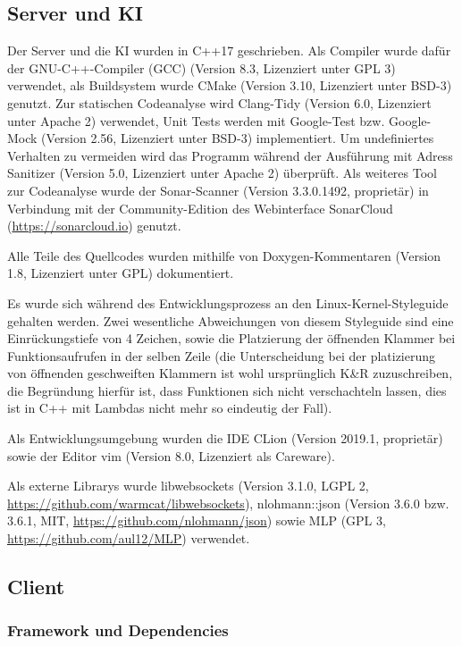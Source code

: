 \subsection{Server und KI}
Der Server und die KI wurden in C++17 geschrieben.
Als Compiler wurde dafür der GNU-C++-Compiler (GCC) (Version 8.3, Lizenziert unter GPL 3) verwendet,
als Buildsystem wurde CMake (Version 3.10, Lizenziert unter BSD-3) genutzt.
Zur statischen Codeanalyse wird Clang-Tidy (Version 6.0, Lizenziert unter Apache 2) verwendet,
Unit Tests werden mit Google-Test bzw. Google-Mock (Version 2.56, Lizenziert unter BSD-3) implementiert.
Um undefiniertes Verhalten zu vermeiden wird das Programm während der Ausführung mit Adress Sanitizer (Version 5.0, Lizenziert unter Apache 2) überprüft.
Als weiteres Tool zur Codeanalyse wurde der Sonar-Scanner (Version 3.3.0.1492, proprietär) in Verbindung mit der Community-Edition des Webinterface SonarCloud (\url{https://sonarcloud.io}) genutzt.

Alle Teile des Quellcodes wurden mithilfe von Doxygen-Kommentaren (Version 1.8, Lizenziert unter GPL) dokumentiert.

Es wurde sich während des Entwicklungsprozess an den Linux-Kernel-Styleguide gehalten werden. Zwei wesentliche Abweichungen von diesem Styleguide sind eine Einrückungstiefe von 4 Zeichen, sowie die Platzierung der öffnenden Klammer bei Funktionsaufrufen in der selben Zeile (die Unterscheidung bei der platizierung von öffnenden geschweiften Klammern ist wohl ursprünglich K\&R zuzuschreiben, die Begründung hierfür ist, dass Funktionen sich nicht verschachteln lassen, dies
ist in C++ mit Lambdas nicht mehr so eindeutig der Fall).

Als Entwicklungsumgebung wurden die IDE CLion (Version 2019.1, proprietär) sowie der Editor vim (Version 8.0, Lizenziert als Careware).

Als externe Librarys wurde libwebsockets (Version 3.1.0, LGPL 2, \url{https://github.com/warmcat/libwebsockets}), 
nlohmann::json (Version 3.6.0 bzw. 3.6.1, MIT, \url{https://github.com/nlohmann/json}) sowie 
MLP (GPL 3, \url{https://github.com/aul12/MLP}) verwendet.

\subsection{Client}

\subsubsection{Framework und Dependencies}
